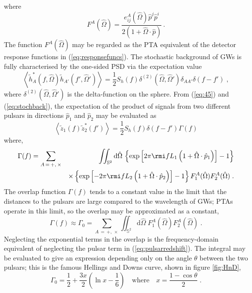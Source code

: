 where
\begin{equation}
F^{A}(\hat{\Omega}) = \frac{e_{ij}^{A}(\hat{\Omega})\hat{p}^{j}\hat{p}^{i}} {2\left(1+\hat{\Omega}\cdot\hat{p}\right)} \, .
\end{equation}
The function $F^{A}(\hat{\Omega})$ may be regarded as the PTA equivalent of the detector response functions in (\ref{eq:responsefuncs}). The stochastic background of GWs is fully characterised by the one-sided PSD via the expectation value
\begin{equation}\label{eq:stochback}
\left<\tilde{h}_{A}^{*}(f,\hat{\Omega})\tilde{h}_{A'}(f',\hat{\Omega}')\right> = \frac{1}{2}S_{h}(f)\delta^{(2)}(\hat{\Omega}, \hat{\Omega}')\delta_{AA'}\delta(f-f') \; ,
\end{equation}
where $\delta^{(2)}(\hat{\Omega},\hat{\Omega}')$ is the delta-function on the sphere. From (\ref{eq:45}) and (\ref{eq:stochback}), the expectation of the product of signals from two different pulsars in directions $\hat{p}_{1}$ and $\hat{p}_{2}$ may be evaluated as
\begin{equation} 
\left<\tilde{z}_{1}(f)\tilde{z}_{2}^{*}(f')\right> = \frac{1}{2}S_{h}(f)\delta (f-f')\Gamma(f)
\end{equation}
where,
\begin{eqnarray}
\Gamma(f) &= \sum_{A\,=\,+,\,\times} & \iint_{{\mathbb{S}}^{2}}\mathrm{d}\hat{\Omega}\,\left\{\exp\left[2\pi\rmi fL_{1}\left(1+\hat{\Omega}\cdot\hat{p}_{1}\right)\right]-1\right\} \nonumber \\*
 & & \times \left\{\exp\left[-2\pi\rmi fL_{2}\left(1+\hat{\Omega}\cdot\hat{p}_{2}\right)\right]-1\right\} F_{1}^{A}(\hat{\Omega})F_{2}^{A}(\hat{\Omega}) \; .
\end{eqnarray}
The overlap function $\Gamma(f)$ tends to a constant value in the limit that the distances to the pulsars are large compared to the wavelength of GWs; PTAs operate in this limit, so the overlap may be approximated as a constant, 
\begin{equation}
\Gamma(f) \approx \Gamma_{0} = \sum_{A\,=\,+,\,\times}\iint_{{\mathbb{S}}^{2}}\mathrm{d}\hat{\Omega}\;F_{1}^{A}(\hat{\Omega})F_{2}^{A}(\hat{\Omega})\;.
\end{equation}
Neglecting the exponential terms in the overlap is the frequency-domain equivalent of neglecting the pulsar term in (\ref{eq:pulsarredshift}). The integral may be evaluated to give an expression depending only on the angle $\theta$ between the two pulsars; this is the famous Hellings and Downs curve, shown in figure \ref{fig:HnD},
\begin{equation}
\Gamma_{0} = \frac{1}{2}+\frac{3x}{2}\left(\ln x -\frac{1}{6}\right)\quad \textrm{where}\quad x = \frac{1-\cos\theta}{2}\; .
\end{equation}
